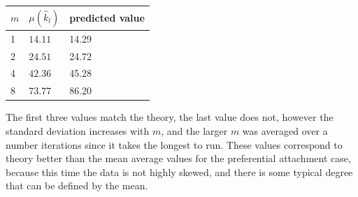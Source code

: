 \documentclass[twoside]{article}
\begin{document}
\begin{center}
    \begin{tabular}{|   l|   l|   l|}
    \hline
    $m$ & $\mu(\hat{k}_l)$  & predicted value 	\\ \hline
    1 & $14.11 $&14.29	 		\\ \hline
    2 & $24.51 $ &24.72 			\\ \hline
    4 &  $42.36 $ &45.28			\\ \hline
    8 &  $73.77 $ &86.20			\\ \hline
    \end{tabular}
\end{center}
The first three values match the theory, the last value does not, however the standard deviation increases with $m$, and the larger $m$ was averaged over a number iterations since it takes the longest to run. These values correspond to theory better than the mean average values for the preferential attachment case, because this time the data is not highly skewed, and there is some typical degree that can be defined by the mean. 
\clearpage
\end{document}
